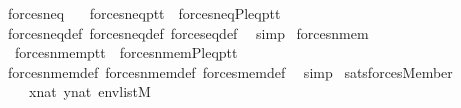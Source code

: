 \begin{isabellebody}
\isanewline
\isanewline
{}\isamarkupfalse%
\ forces{\isacharunderscore}{\kern0pt}neq\ {\isacharcolon}{\kern0pt}\isanewline
\ \ {\isachardoublequoteopen}forces{\isacharunderscore}{\kern0pt}neq{\isacharparenleft}{\kern0pt}p{\isacharcomma}{\kern0pt}t{}{\isacharcomma}{\kern0pt}t{}{\isacharparenright}{\kern0pt}\ {\isasymlongleftrightarrow}\ forces{\isacharunderscore}{\kern0pt}neq{\isacharprime}{\kern0pt}{\isacharparenleft}{\kern0pt}P{\isacharcomma}{\kern0pt}leq{\isacharcomma}{\kern0pt}p{\isacharcomma}{\kern0pt}t{}{\isacharcomma}{\kern0pt}t{}{\isacharparenright}{\kern0pt}{\isachardoublequoteclose}\isanewline
%
\isadelimproof
\ \ %
\endisadelimproof
%
\isatagproof
{}\isamarkupfalse%
\ forces{\isacharunderscore}{\kern0pt}neq{\isacharunderscore}{\kern0pt}def\ forces{\isacharunderscore}{\kern0pt}neq{\isacharprime}{\kern0pt}{\isacharunderscore}{\kern0pt}def\ forces{\isacharunderscore}{\kern0pt}eq{\isacharunderscore}{\kern0pt}def\ \isamarkupfalse%
\ simp%
\endisatagproof
{\isafoldproof}%
%
\isadelimproof
\isanewline
%
\endisadelimproof
\isanewline
{}\isamarkupfalse%
\ forces{\isacharunderscore}{\kern0pt}nmem\ {\isacharcolon}{\kern0pt}\isanewline
\ \ {\isachardoublequoteopen}forces{\isacharunderscore}{\kern0pt}nmem{\isacharparenleft}{\kern0pt}p{\isacharcomma}{\kern0pt}t{}{\isacharcomma}{\kern0pt}t{}{\isacharparenright}{\kern0pt}\ {\isasymlongleftrightarrow}\ forces{\isacharunderscore}{\kern0pt}nmem{\isacharprime}{\kern0pt}{\isacharparenleft}{\kern0pt}P{\isacharcomma}{\kern0pt}leq{\isacharcomma}{\kern0pt}p{\isacharcomma}{\kern0pt}t{}{\isacharcomma}{\kern0pt}t{}{\isacharparenright}{\kern0pt}{\isachardoublequoteclose}\isanewline
%
\isadelimproof
\ \ %
\endisadelimproof
%
\isatagproof
{}\isamarkupfalse%
\ forces{\isacharunderscore}{\kern0pt}nmem{\isacharunderscore}{\kern0pt}def\ forces{\isacharunderscore}{\kern0pt}nmem{\isacharprime}{\kern0pt}{\isacharunderscore}{\kern0pt}def\ forces{\isacharunderscore}{\kern0pt}mem{\isacharunderscore}{\kern0pt}def\ \isamarkupfalse%
\ simp%
\endisatagproof
{\isafoldproof}%
%
\isadelimproof
\isanewline
%
\endisadelimproof
\isanewline
\isanewline
{}\isamarkupfalse%
\ sats{\isacharunderscore}{\kern0pt}forces{\isacharunderscore}{\kern0pt}Member\ {\isacharcolon}{\kern0pt}\isanewline
\ \ \ \ {\isachardoublequoteopen}x{\isasymin}nat{\isachardoublequoteclose}\ {\isachardoublequoteopen}y{\isasymin}nat{\isachardoublequoteclose}\ {\isachardoublequoteopen}env{\isasymin}list{\isacharparenleft}{\kern0pt}M{\isacharparenright}{\kern0pt}{\isachardoublequoteclose}\isanewline

\end{isabellebody}

